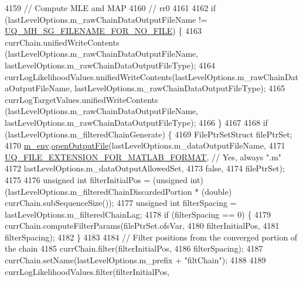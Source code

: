 \begin{DoxyCode}
4159 \textcolor{preprocessor}{}      \textcolor{comment}{// Compute MLE and MAP}
4160       \textcolor{comment}{// rr0}
4161 
4162       \textcolor{keywordflow}{if} (lastLevelOptions.m\_rawChainDataOutputFileName != 
      \hyperlink{_metropolis_hastings_s_g_options_8h_a75699ceb938d800e2b7f59ede3ea9a31}{UQ\_MH\_SG\_FILENAME\_FOR\_NO\_FILE}) \{
4163         currChain.unifiedWriteContents              (lastLevelOptions.m\_rawChainDataOutputFileName,
      lastLevelOptions.m\_rawChainDataOutputFileType);
4164         currLogLikelihoodValues.unifiedWriteContents(lastLevelOptions.m\_rawChainDataOutputFileName,
      lastLevelOptions.m\_rawChainDataOutputFileType);
4165         currLogTargetValues.unifiedWriteContents    (lastLevelOptions.m\_rawChainDataOutputFileName,
      lastLevelOptions.m\_rawChainDataOutputFileType);
4166       \}
4167 
4168       \textcolor{keywordflow}{if} (lastLevelOptions.m\_filteredChainGenerate) \{
4169         FilePtrSetStruct filePtrSet;
4170         \hyperlink{class_q_u_e_s_o_1_1_m_l_sampling_a13f1ca4fe9f94822fe572a743eaced1d}{m\_env}.\hyperlink{class_q_u_e_s_o_1_1_base_environment_ab8fe853074f12ea34e18724119a2fc75}{openOutputFile}(lastLevelOptions.m\_dataOutputFileName,
4171                              \hyperlink{_defines_8h_ac440026eff7deb1c1eed1eea0e8e36ba}{UQ\_FILE\_EXTENSION\_FOR\_MATLAB\_FORMAT}, \textcolor{comment}{//
       Yes, always ".m"}
4172                              lastLevelOptions.m\_dataOutputAllowedSet,
4173                              \textcolor{keyword}{false},
4174                              filePtrSet);
4175 
4176         \textcolor{keywordtype}{unsigned} \textcolor{keywordtype}{int} filterInitialPos = (\textcolor{keywordtype}{unsigned} int) (lastLevelOptions.m\_filteredChainDiscardedPortion * 
      (\textcolor{keywordtype}{double}) currChain.subSequenceSize());
4177         \textcolor{keywordtype}{unsigned} \textcolor{keywordtype}{int} filterSpacing    = lastLevelOptions.m\_filteredChainLag;
4178         \textcolor{keywordflow}{if} (filterSpacing == 0) \{
4179           currChain.computeFilterParams(filePtrSet.ofsVar,
4180                                         filterInitialPos,
4181                                         filterSpacing);
4182         \}
4183 
4184         \textcolor{comment}{// Filter positions from the converged portion of the chain}
4185         currChain.filter(filterInitialPos,
4186                          filterSpacing);
4187         currChain.setName(lastLevelOptions.m\_prefix + \textcolor{stringliteral}{"filtChain"});
4188 
4189         currLogLikelihoodValues.filter(filterInitialPos,

\end{DoxyCode}
